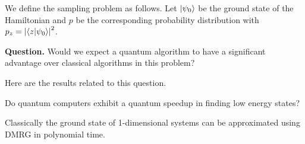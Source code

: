\documentclass[twocolumn]{revtex4-2}
\newcommand{\abs}[1]{\left|#1\right|}
\begin{document}
We define the sampling problem as follows. Let $\ket{\psi_0}$ be the ground
state of the Hamiltonian and $p$ be the corresponding probability distribution
with $p_z = \abs{\braket{z|\psi_0}}^2$.

\textbf{Question.} Would we expect a quantum algorithm to have a significant
advantage over classical algorithms in this problem?

Here are the results related to this question.

Do quantum computers exhibit a quantum speedup in finding low
energy states?

Classically the ground state of 1-dimensional systems can be approximated using
DMRG in polynomial time.
\end{document}
